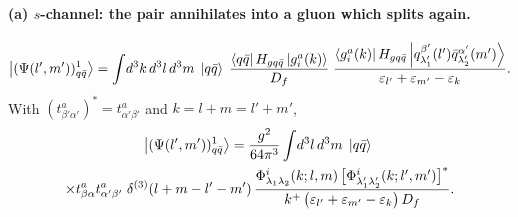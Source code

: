 \paragraph{(a) $s$-channel: the pair annihilates into a gluon which splits again.}
\begin{center}
\end{center}
\begin{equation}
\left|(\Psi(l',m'))^{1}_{q\bar q}\right\rangle=\int\! d^{3}k\,d^{3}l\,d^{3}m\;\left|q\bar q\right\rangle\;
\frac{\left\langle q\bar q\right|H_{gq\bar q}\left|g^{a}_{i}(k)\right\rangle}{D_{f}}\;
\frac{\left\langle g^{a}_{i}(k)\right|H_{gq\bar q}\left|q^{\beta'}_{\lambda_{1}'}(l')\bar q^{\alpha'}_{\lambda_{2}'}(m')\right\rangle}
{\varepsilon_{l'}+\varepsilon_{m'}-\varepsilon_{k}} .
\end{equation}
With $(t^{a}_{\beta'\alpha'})^{*}=t^{a}_{\alpha'\beta'}$ and $k=l+m=l'+m'$,
\begin{multline}
\left|(\Psi(l',m'))^{1}_{q\bar q}\right\rangle=\frac{g^{2}}{64\pi^{3}}\int\!d^{3}l\,d^{3}m\;\left|q\bar q\right\rangle\;
\\
\times t^{a}_{\beta\alpha}t^{a}_{\alpha'\beta'}\;\delta^{(3)}(l+m-l'-m')\,
\frac{\Phi^{i}_{\lambda_{1}\lambda_{2}}(k;l,m)\,
\big[\Phi^{i}_{\lambda_{1}'\lambda_{2}'}(k;l',m')\big]^{*}}
{k^{+}\,\big(\varepsilon_{l'}+\varepsilon_{m'}-\varepsilon_{k}\big)\,D_{f}} .
\label{eq:D3a}
\end{multline}

